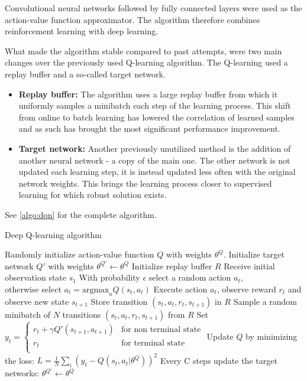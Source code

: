 Convolutional neural networks followed by fully connected layers were used as the action-value function approximator.
The algorithm therefore combines reinforcement learning with deep learning.

 What made the algorithm stable compared to past attempts, were two main changes over the previously used Q-learning algorithm. The Q-learning used a replay buffer and a so-called target network. 
\begin{itemize}

\item \textbf{Replay buffer:} The algorithm uses a large replay buffer from which it uniformly samples a minibatch each step of the learning process. This shift from online to batch learning has lowered the correlation of learned samples and as such has brought the most significant performance improvement.

\item \textbf{Target network:} Another previously unutilized method is the addition of another neural network - a copy of the main one. The other network is not updated each learning step, it is instead updated less often with the original network weights. This brings the learning process closer to supervised learning for which robust solution exists.
\end{itemize}

See \ref{algo:dqn} for the complete algorithm.
\begin{algorithm}[h]
  \caption{Deep Q-learning algorithm \label{algo:dqn}}
  \label{algo:dqn}
  \begin{algorithmic}
    \STATE Randomly initialize action-value function $Q$ with weights $\theta^{Q}$.
    \STATE Initialize target network $Q'$ with weights $\theta^{Q'}
    \leftarrow \theta^{Q}$
    \STATE Initialize replay buffer $R$
      \STATE Receive initial observation state $s_1$
        \STATE With probability $\epsilon$ select a random action $a_t$,\\
        otherwise select $a_t = \text{argmax}_a Q(s_t, a_t)$
        \STATE Execute action $a_t$, observe
        reward $r_t$ and observe new state $s_{t+1}$
        \STATE Store transition $(s_t, a_t,
                r_t, s_{t+1})$ in $R$
        \STATE Sample a random minibatch of $N$ transitions
               $(s_t, a_t, r_t, s_{t + 1})$ from $R$
        \STATE Set $ y_t = 
        \begin{cases}
            r_t + \gamma Q'(s_{t + 1}, a_{t+1}) &
                                  \text {for non terminal state} \\
                                  r_t & \text{for terminal state} \\
            \end{cases} $
        \STATE Update $Q$ by minimizing the loss:
               $L = \frac{1}{N} \sum_i (y_t -
               Q(s_t, a_t | \theta^Q))^2$
        \STATE Every C steps update the target networks: $\theta^{Q'} \leftarrow \theta^{Q}$
        \ENDFOR
    \ENDFOR
  \end{algorithmic}
\end{algorithm}

